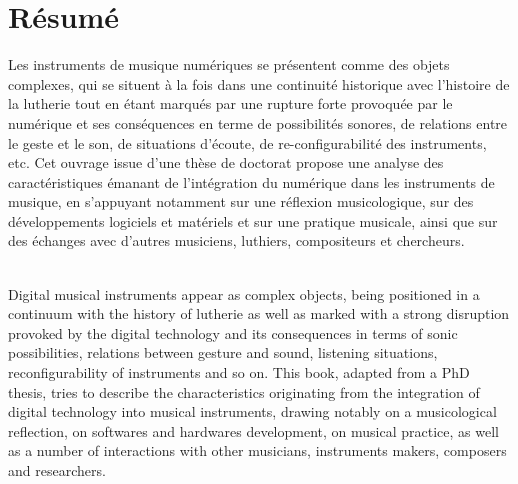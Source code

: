 %
\chapter*{Résumé}
\label{sec:abstract}
\vspace*{-10mm}

\noindent Les instruments de musique numériques se présentent comme des objets complexes, qui se situent à la fois dans une continuité historique avec l'histoire de la lutherie tout en étant marqués par une rupture forte provoquée par le numérique et ses conséquences en terme de possibilités sonores, de relations entre le geste et le son, de situations d'écoute, de re-configurabilité des instruments, etc. Cet ouvrage issue d'une thèse de doctorat propose une analyse des caractéristiques émanant de l'intégration du numérique dans les instruments de musique, en s'appuyant notamment sur une réflexion musicologique, sur des développements logiciels et matériels et sur une pratique musicale, ainsi que sur des échanges avec d'autres musiciens, luthiers, compositeurs et chercheurs.

\vspace*{20mm}

\label{sec:abstract-diff} \\

\noindent Digital musical instruments appear as complex objects, being positioned in a continuum with the history of lutherie as well as marked with a strong disruption provoked by the digital technology and its consequences in terms of sonic possibilities, relations between gesture and sound, listening situations, reconfigurability of instruments and so on. This book, adapted from a PhD thesis, tries to describe the characteristics originating from the integration of digital technology into musical instruments, drawing notably on a musicological reflection, on softwares and hardwares development, on musical practice, as well as a number of interactions with other musicians, instruments makers, composers and researchers.
